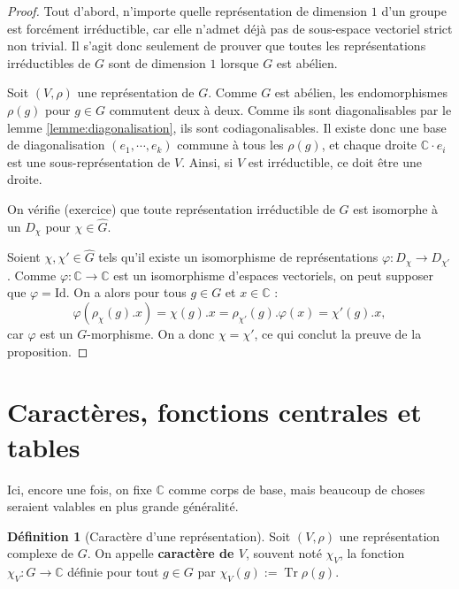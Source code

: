 \documentclass[a4paper]{article}
\theoremstyle{definition} %
\newtheorem{Def}{Définition}[section] %
\theoremstyle{plain} %
\theoremstyle{remark} %
\newcommand{\C}{\mathbb{C}}
\begin{document}
\begin{proof}

	Tout d'abord, n'importe quelle représentation de dimension $1$ d'un groupe est forcément irréductible, car elle n'admet déjà pas de sous-espace vectoriel strict non trivial. Il s'agit donc seulement de prouver que toutes les représentations irréductibles de $G$ sont de dimension $1$ lorsque $G$ est abélien.
	
	Soit $(V,\rho)$ une représentation de $G$.
	Comme $G$ est abélien, les endomorphismes $\rho(g)$ pour $g \in G$ commutent deux à deux.
	Comme ils sont diagonalisables par le lemme \ref{lemme:diagonalisation}, ils sont codiagonalisables.
	Il existe donc une base de diagonalisation $(e_1, \cdots, e_k)$ commune à tous les $\rho(g)$, et chaque droite $\mathbb{C} \cdot e_i$ est une sous-représentation de $V$.
	Ainsi, si $V$ est irréductible, ce doit être une droite. 
	
	On vérifie (exercice) que toute représentation irréductible de $G$ est isomorphe à un $D_\chi$ pour $\chi\in \widehat{G}$.
	
	Soient $\chi,\chi'\in \widehat{G}$ tels qu'il existe un isomorphisme de représentations $\varphi: D_\chi\rightarrow D_{\chi'}$. Comme $\varphi:\C\rightarrow \C$ est un isomorphisme d'espaces vectoriels, on peut supposer que $\varphi=\mathrm{Id}$. On a alors pour tous  $g\in G$ et $x\in \C$ :  \[\varphi(\rho_\chi(g).x)=\chi(g).x=\rho_{\chi'}(g).\varphi(x)=\chi'(g).x,\] car $\varphi$ est un $G$-morphisme. On a donc $\chi=\chi'$, ce qui conclut la preuve de la proposition.
\end{proof}



\section{Caractères, fonctions centrales et tables}

Ici, encore une fois, on fixe $\mathbb{C}$ comme corps de base, mais beaucoup de choses seraient valables en plus grande généralité. %

\begin{Def}[Caractère d'une représentation]
	\hspace*{\fill}
	
	Soit $(V,\rho)$ une représentation complexe de $G$. On appelle \textbf{caractère de $V$}, souvent noté $\chi_V$, la fonction $\chi_V : G \rightarrow \mathbb{C}$ définie pour tout $g \in G$ par 
	$\chi_V(g) := \operatorname{Tr} \rho(g)$.
\end{Def}
\end{document}
